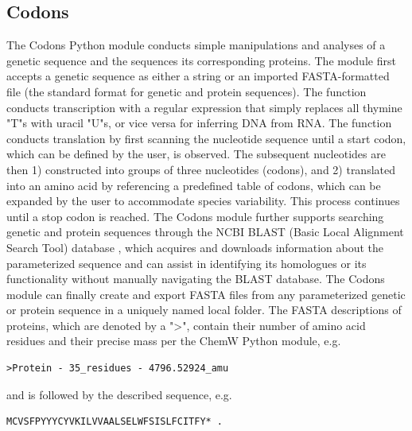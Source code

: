 \subsection*{Codons}
The Codons Python module conducts simple manipulations and analyses of a genetic sequence and the sequences its corresponding proteins. The module first accepts a genetic sequence as either a string or an imported FASTA-formatted file \cite{Lipman1985RapidSearches} (the standard format for genetic and protein sequences). The  function conducts transcription with a regular expression \cite{Thompson1968ProgrammingAlgorithm} that simply replaces all thymine "T"s with uracil "U"s, or vice versa for inferring DNA from RNA. The  function conducts translation by first scanning the nucleotide sequence until a start codon, which can be defined by the user, is observed. The subsequent nucleotides are then 1) constructed into groups of three nucleotides (codons), and 2) translated into an amino acid by referencing a predefined table of codons, which can be expanded by the user to accommodate species variability. This process continues until a stop codon is reached. The Codons module further supports searching genetic and protein sequences through the NCBI BLAST (Basic Local Alignment Search Tool) database \cite{Johnson2008NCBIInterface.,Price2019CuratedGenomes}, which acquires and downloads information about the parameterized sequence and can assist in identifying its homologues or its functionality without manually navigating the BLAST database. The Codons module can finally create and export FASTA files from any parameterized genetic or protein sequence in a uniquely named local folder. The FASTA descriptions of proteins, which are denoted by a ">", contain their number of amino acid residues and their precise mass per the ChemW Python module, e.g. 
\begin{lstlisting}[label = fasta_protein]
>Protein - 35_residues - 4796.52924_amu
\end{lstlisting}
and is followed by the described sequence, e.g.
\begin{lstlisting}
MCVSFPYYYCYVKILVVAALSELWFSISLFCITFY* .
\end{lstlisting}

